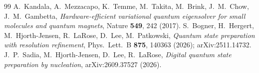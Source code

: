 \documentclass[aps,prc,reprint,superscriptaddress,floatfix,nofootinbib]{revtex4-2}
\begin{document}
\begin{thebibliography}{99}
A.~Kandala, A.~Mezzacapo, K.~Temme, M.~Takita, M.~Brink, J.~M.~Chow,
J.~M.~Gambetta,
\textit{Hardware-efficient variational quantum eigensolver for small molecules
and quantum magnets},
Nature \textbf{549}, 242 (2017).
S.~Bogner, H.~Hergert, M.~Hjorth-Jensen, R.~LaRose, D.~Lee, M.~Patkowski,
\textit{Quantum state preparation with resolution refinement},
Phys.\ Lett.\ B \textbf{875}, 140363 (2026); arXiv:2511.14732.
J.~P.~Sadia, M.~Hjorth-Jensen, D.~Lee, R.~LaRose,
\textit{Digital quantum state preparation by nucleation},
arXiv:2609.37527 (2026).
\end{thebibliography}
\end{document}
